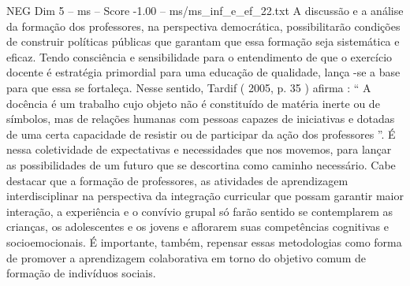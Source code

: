 \begin{textsample}{NEG Dim 5 – ms – Score -1.00 – ms/ms\_inf\_e\_ef\_22.txt}
A discussão e a análise da formação dos professores, na perspectiva democrática, possibilitarão condições de construir políticas públicas que garantam que essa formação seja sistemática e eficaz.
Tendo consciência e sensibilidade para o entendimento de que o exercício docente é estratégia primordial para uma educação de qualidade, lança -se a base para que essa se fortaleça.
Nesse sentido, Tardif ( 2005, p. 35 ) afirma : “ A docência é um trabalho cujo objeto não é constituído de matéria inerte ou de símbolos, mas de relações humanas com pessoas capazes de iniciativas e dotadas de uma certa capacidade de resistir ou de participar da ação dos professores ”.
É nessa coletividade de expectativas e necessidades que nos movemos, para lançar as possibilidades de um futuro que se descortina como caminho necessário.
Cabe destacar que a formação de professores, as atividades de aprendizagem interdisciplinar na perspectiva da integração curricular que possam garantir maior interação, a experiência e o convívio grupal só farão sentido se contemplarem as crianças, os adolescentes e os jovens e aflorarem suas competências cognitivas e socioemocionais.
É importante, também, repensar essas metodologias como forma de promover a aprendizagem colaborativa em torno do objetivo comum de formação de indivíduos sociais.

\end{textsample}
